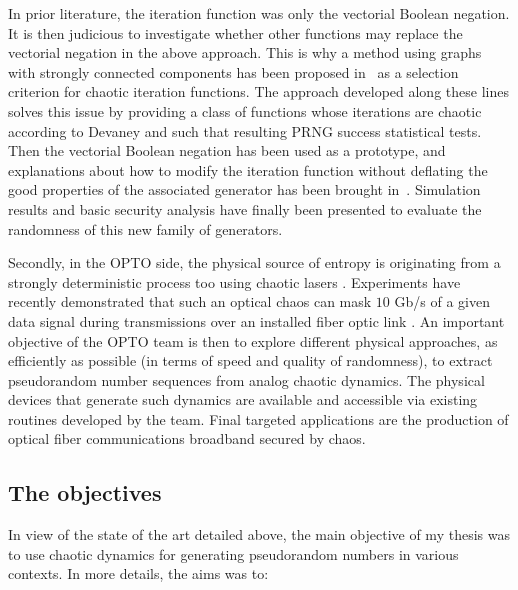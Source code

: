 In prior literature, the iteration function was only the vectorial Boolean negation. It is then judicious to investigate whether other functions may replace the vectorial negation in the above approach. 
This is why %
a method using graphs with strongly connected components has been proposed in~\cite{bcgw11:ip} as a selection criterion for chaotic iteration functions. The approach developed along these lines solves this issue by providing a class of functions whose iterations are chaotic according to Devaney and such that resulting PRNG success statistical tests.
Then the vectorial Boolean negation has been used as a prototype, and explanations about how to modify the iteration function without deflating the good properties of the associated generator has been brought in~\cite{bfgw11:ip}. Simulation results and basic security analysis have finally been presented to evaluate the randomness of this new family of generators.



Secondly, in the OPTO side, the physical source of entropy is originating from a strongly deterministic 
process too using chaotic lasers \cite{weicker:pre12,PhysRevE.86.055201,PhysRevLett.107.034103}. Experiments have recently demonstrated
that such an optical chaos can mask $10$ Gb/s of a given data signal during
transmissions over an installed fiber optic link \cite{lavrov:jqe10}. 
An important objective of  the OPTO team is then to explore different 
physical approaches, as efficiently as possible (in terms of speed and quality of 
randomness), to extract pseudorandom number sequences from analog chaotic dynamics. 
The physical devices that generate such dynamics are available and accessible via existing routines 
developed by the team.
Final targeted applications are the production of optical fiber communications broadband secured by chaos.



\subsection{The objectives}


In view of the state of the art detailed above, the main objective of my thesis was to use chaotic dynamics for generating pseudorandom numbers in various contexts. In more details, the aims was to:

